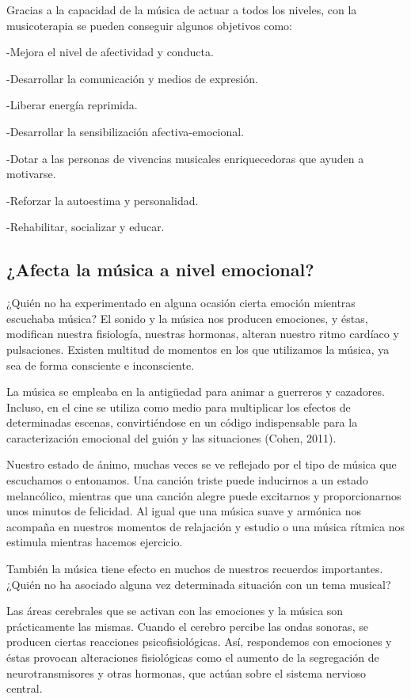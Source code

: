 \documentclass{bmcart}
\begin{document}
Gracias a la capacidad de la música de actuar a todos los niveles, con la musicoterapia se pueden conseguir algunos objetivos como:

-Mejora el nivel de afectividad y conducta.

-Desarrollar la comunicación y medios de expresión.

-Liberar energía reprimida.

-Desarrollar la sensibilización afectiva-emocional.

-Dotar a las personas de vivencias musicales enriquecedoras que ayuden a motivarse.

-Reforzar la autoestima y personalidad.

-Rehabilitar, socializar y educar.

\subsection*{¿Afecta la música a nivel emocional?}
¿Quién no ha experimentado en alguna ocasión cierta emoción mientras escuchaba música? El sonido y la música nos producen emociones, y éstas, modifican nuestra fisiología, nuestras hormonas, alteran nuestro ritmo cardíaco y pulsaciones. Existen multitud de momentos en los que utilizamos la música, ya sea de forma consciente e inconsciente.

La música se empleaba en la antigüedad para animar a guerreros y cazadores. Incluso, en el cine se utiliza como medio para multiplicar los efectos de determinadas escenas, convirtiéndose en un código indispensable para la caracterización emocional del guión y las situaciones (Cohen, 2011).

Nuestro estado de ánimo, muchas veces se ve reflejado por el tipo de música que escuchamos o entonamos. Una canción triste puede inducirnos a un estado melancólico, mientras que una canción alegre puede excitarnos y proporcionarnos unos minutos de felicidad. Al igual que una música suave y armónica nos acompaña en nuestros momentos de relajación y estudio o una música rítmica nos estimula mientras hacemos ejercicio.

También la música tiene efecto en muchos de nuestros recuerdos importantes. ¿Quién no ha asociado alguna vez determinada situación con un tema musical?

Las áreas cerebrales que se activan con las emociones y la música son prácticamente las mismas. Cuando el cerebro percibe las ondas sonoras, se producen ciertas reacciones psicofisiológicas. Así, respondemos con emociones y éstas provocan alteraciones fisiológicas como el aumento de la segregación de neurotransmisores y otras hormonas, que actúan sobre el sistema nervioso central.
\end{document}
